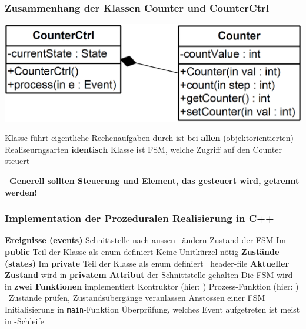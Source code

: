\subsubsection{Zusammenhang der Klassen Counter und CounterCtrl}
\label{Zusammenhang der Klassen Counter und CounterCtrl}

\begin{center}
    \includegraphics[width=0.7\columnwidth]{images/fsm_CPP_klassendiagramm.png}
\end{center}

\begin{outline}
    \1 Klasse  führt eigentliche Rechenaufgaben durch
        \2 ist bei \textbf{allen} (objektorientierten) Realiseurngsarten \textbf{identisch}
    \1 Klasse  ist FSM, welche Zugriff auf den Counter steuert 
\end{outline}

\textbf{ \textrightarrow\ Generell sollten Steuerung und Element, das gesteuert wird, getrennt werden!}


\subsubsection{Implementation der Prozeduralen Realisierung in C++}

\begin{outline}
    \1 \textbf{Ereignisse (events)}
        \2 Schnittstelle nach aussen \textrightarrow\ ändern Zustand der FSM
        \2 Im \textbf{public} Teil der Klasse als enum definiert
        \2 Keine Unitkürzel nötig
    \1 \textbf{Zustände (states)}
        \2 Im \textbf{private} Teil der Klasse als enum definiert \textrightarrow\ header-file
    \1 \textbf{Aktueller Zustand}  wird in \textbf{privatem Attribut} der Schnittstelle gehalten
    \1 Die FSM wird in \textbf{zwei Funktionen} implementiert
        \2 Kontruktor (hier: )
        \2 Prozess-Funktion (hier: ) \\
            \textrightarrow\ Zustände prüfen, Zustandsübergänge veranlassen
    \1 Anstossen einer FSM
        \2 Initialisierung in \lstinline|main|-Funktion
        \2 Überprüfung, welches Event aufgetreten ist meist in -Schleife
\end{outline}


